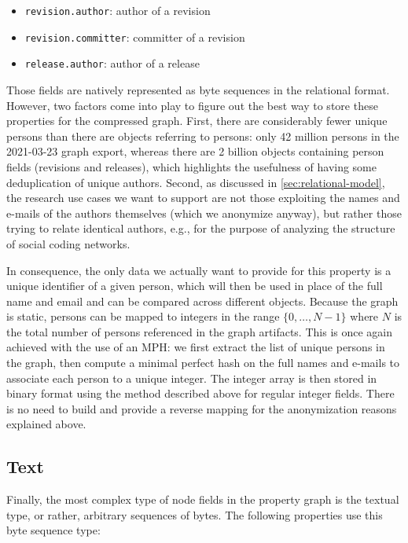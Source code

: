 \begin{itemize}
    \setlength\itemsep{0em}
    \item \texttt{revision.author}: author of a revision
    \item \texttt{revision.committer}: committer of a revision
    \item \texttt{release.author}: author of a release
\end{itemize}

Those fields are natively represented as byte sequences in the relational
format.  However, two factors come into play to figure out the best way to
store these properties for the compressed graph. First, there are considerably
fewer unique persons than there are objects referring to persons: only 42
million persons in the 2021-03-23 graph export, whereas there are 2 billion
objects containing person fields (revisions and releases), which highlights the
usefulness of having some deduplication of unique authors. Second, as discussed
in \cref{sec:relational-model}, the research use cases we want to support are
not those exploiting the names and e-mails of the authors themselves (which we
anonymize anyway), but rather those trying to relate identical authors, e.g.,
for the purpose of analyzing the structure of social coding networks.

In consequence, the only data we actually want to provide for this property is
a unique identifier of a given person, which will then be used in place of the
full name and email and can be compared across different objects.
Because the graph is static, persons can be mapped to integers in the range
$\{0,\ldots,N-1\}$ where $N$ is the total number of persons referenced in the
graph artifacts. This is once again achieved with the use of an \gls{MPH}: we
first extract the list of unique persons in the graph, then compute a minimal
perfect hash on the full names and e-mails to associate each person to a unique
integer. The integer array is then stored in binary format using the method
described above for regular integer fields. There is no need to build and
provide a reverse mapping for the anonymization reasons explained above.

\subsection{Text}%
\label{sec:mapping-text}

Finally, the most complex type of node fields in the property graph is the
textual type, or rather, arbitrary sequences of bytes. The following properties
use this byte sequence type:

